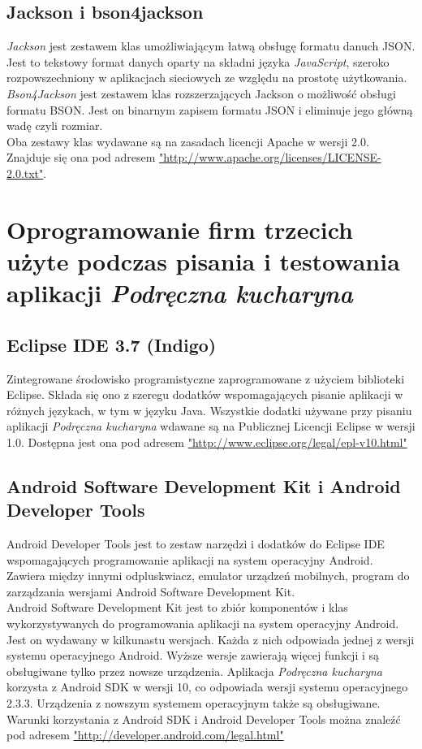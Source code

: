 \documentclass[12pt,leqno, twoside]{mwart}
\begin{document}
\subsection{Jackson i bson4jackson}
\emph{Jackson} jest zestawem klas umożliwiającym łatwą obsługę formatu danuch JSON.
Jest to tekstowy format danych oparty na składni języka \emph{JavaScript}, szeroko rozpowszechniony w aplikacjach sieciowych ze względu na prostotę użytkowania. \\
\emph{Bson4Jackson} jest zestawem klas rozszerzających Jackson o możliwość obsługi formatu BSON.
Jest on binarnym zapisem formatu JSON i eliminuje jego główną wadę czyli rozmiar.\\
Oba zestawy klas wydawane są na zasadach licencji Apache w wersji 2.0.
Znajduje się ona pod adresem \url{"http://www.apache.org/licenses/LICENSE-2.0.txt"}.
\section{Oprogramowanie firm trzecich użyte podczas pisania i testowania aplikacji \emph{Podręczna kucharyna}}
\subsection{Eclipse IDE 3.7 (Indigo)}
Zintegrowane środowisko programistyczne zaprogramowane z użyciem biblioteki Eclipse. Składa się ono z szeregu dodatków wspomagających pisanie aplikacji w różnych językach, w tym w języku Java. Wszystkie dodatki używane przy pisaniu aplikacji \emph{Podręczna kucharyna} wdawane są na Publicznej Licencji Eclipse w wersji 1.0.
Dostępna jest ona pod adresem \url{"http://www.eclipse.org/legal/epl-v10.html"}
\subsection{Android Software Development Kit i Android Developer Tools}
Android Developer Tools jest to zestaw narzędzi i dodatków do Eclipse IDE wspomagających programowanie aplikacji na system operacyjny Android. Zawiera między innymi odpluskwiacz, emulator urządzeń mobilnych, program do zarządzania wersjami Android Software Development Kit. \\
Android Software Development Kit jest to zbiór komponentów i klas wykorzystywanych do programowania aplikacji na system operacyjny Android. Jest on wydawany w kilkunastu wersjach. Każda z nich odpowiada jednej z wersji systemu operacyjnego Android. Wyższe wersje zawierają więcej funkcji i są obsługiwane tylko przez nowsze urządzenia.
Aplikacja \emph{Podręczna kucharyna} korzysta z Android SDK w wersji 10, co odpowiada wersji systemu operacyjnego 2.3.3. Urządzenia z nowszym systemem operacyjnym także są obsługiwane. \\
Warunki korzystania z Android SDK i Android Developer Tools można znaleźć pod adresem \url{"http://developer.android.com/legal.html"}
\end{document}

